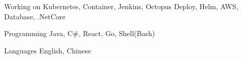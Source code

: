

\begin{cvskills}

  \cvskill
    {Working on} %
    {Kubernetes, Container, Jenkins, Octopus Deploy, Helm, AWS, Database, .NetCore} %

  \cvskill
    {Programming} %
    {Java, C\#, React, Go, Shell(Bash)} %

  \cvskill
    {Languages} %
    {English, Chinese} %

\end{cvskills}
